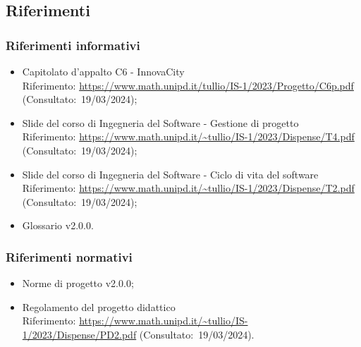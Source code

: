 \subsection{Riferimenti}
\subsubsection{Riferimenti informativi}
    \begin{itemize}
        \item Capitolato d'appalto C6 - InnovaCity \\
        Riferimento: \url{https://www.math.unipd.it/tullio/IS-1/2023/Progetto/C6p.pdf} (Consultato:~19/03/2024);
        \item Slide del corso di Ingegneria del Software - Gestione di progetto \\
        Riferimento: \url{https://www.math.unipd.it/~tullio/IS-1/2023/Dispense/T4.pdf} (Consultato:~19/03/2024); 
        \item Slide del corso di Ingegneria del Software - Ciclo di vita del software \\
        Riferimento: \url{https://www.math.unipd.it/~tullio/IS-1/2023/Dispense/T2.pdf} (Consultato:~19/03/2024);
        \item Glossario v2.0.0.
    \end{itemize}
 
\subsubsection{Riferimenti normativi}
    \begin{itemize}
    \item Norme di progetto v2.0.0;
    \item Regolamento del progetto didattico \\
    Riferimento: \url{https://www.math.unipd.it/~tullio/IS-1/2023/Dispense/PD2.pdf} (Consultato:~19/03/2024).
    \end{itemize}